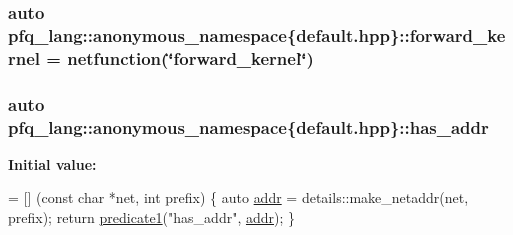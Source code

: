 \hypertarget{namespacepfq__lang_1_1anonymous__namespace_02default_8hpp_03_a453450a8ebf5660ab590a3ffb79057e1}{
\subsubsection[{forward\+\_\+kernel}]{\setlength{\rightskip}{0pt plus 5cm}auto pfq\+\_\+lang\+::anonymous\+\_\+namespace\{default.\+hpp\}\+::forward\+\_\+kernel = {\bf netfunction}(\char`\"{}forward\+\_\+kernel\char`\"{})}}\label{namespacepfq__lang_1_1anonymous__namespace_02default_8hpp_03_a453450a8ebf5660ab590a3ffb79057e1}
\hypertarget{namespacepfq__lang_1_1anonymous__namespace_02default_8hpp_03_ac3ef3eefe441b183db012637b4459836}{
\subsubsection[{has\+\_\+addr}]{\setlength{\rightskip}{0pt plus 5cm}auto pfq\+\_\+lang\+::anonymous\+\_\+namespace\{default.\+hpp\}\+::has\+\_\+addr}}\label{namespacepfq__lang_1_1anonymous__namespace_02default_8hpp_03_ac3ef3eefe441b183db012637b4459836}
{\bfseries Initial value\+:}
\begin{DoxyCode}
= [] (\textcolor{keyword}{const} \textcolor{keywordtype}{char} *net, \textcolor{keywordtype}{int} prefix)
        \{
            \textcolor{keyword}{auto} \hyperlink{namespacepfq__lang_1_1anonymous__namespace_02default_8hpp_03_aafce8334d1be83bff9a2115439c8c453}{addr} = details::make\_netaddr(net, prefix);
            \textcolor{keywordflow}{return} \hyperlink{namespacepfq__lang_ae23a03cee94b5ddfde4a8d2e5c521f0e}{predicate1}(\textcolor{stringliteral}{"has\_addr"}, \hyperlink{namespacepfq__lang_1_1anonymous__namespace_02default_8hpp_03_aafce8334d1be83bff9a2115439c8c453}{addr});
        \}
\end{DoxyCode}
